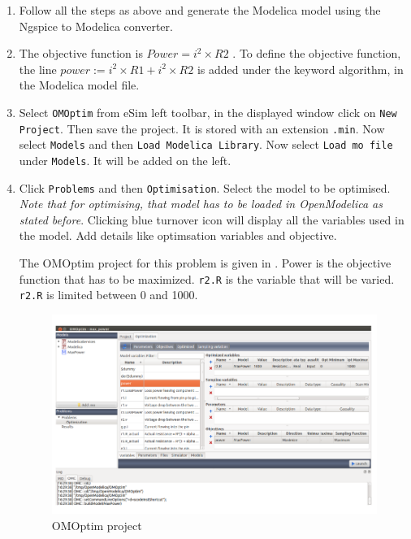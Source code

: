 \begin{enumerate}
\item Follow all the steps as above and generate the Modelica model using the Ngspice to Modelica converter.

\item The objective function is $Power = i^2 \times R2$ . 
To define the objective function, the line $power := i^2 \times R1+ i^2 \times R2$  
is added under the keyword algorithm, in the Modelica model file.

\item Select {\tt OMOptim} from eSim left toolbar, in the displayed window click on {\tt New Project}. Then save the project. It is stored with an extension {\tt .min}. Now select {\tt Models} and then {\tt Load Modelica Library}. Now select {\tt Load mo file} under {\tt Models}. It will be added on the left. 

\item Click {\tt Problems} and then {\tt Optimisation}. Select the model to be optimised. \textit {Note that for optimising, that model has to be loaded in OpenModelica as stated before}. Clicking
blue turnover icon will display all the variables used in the model. Add details like optimsation variables and objective.

The OMOptim project for this problem is given in . Power is the objective function that has to be maximized. {\tt r2.R} is the variable that will be varied. {\tt r2.R} is limited between 0 and 1000.

\begin{figure}[h]
\centering
\includegraphics[width=\hgfig]{list_of_figures/9.png}
\caption{OMOptim project}
\label{om-project}
\end{figure}


\end{enumerate}
